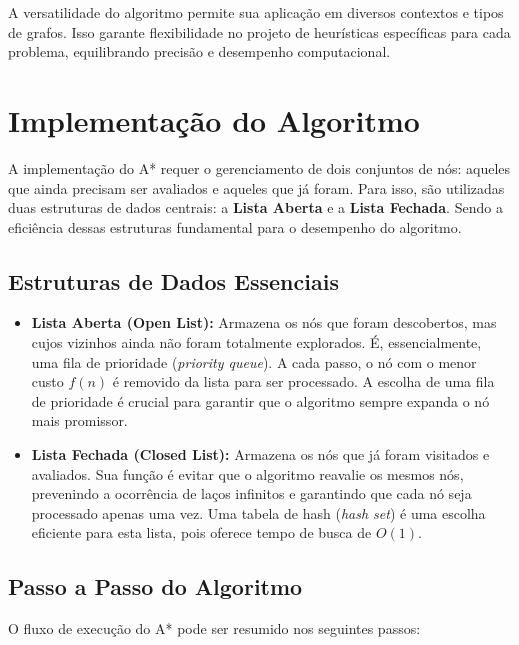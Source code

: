 \documentclass[conference]{IEEEtran}
\begin{document}
A versatilidade do algoritmo permite sua aplicação em diversos contextos e tipos de grafos. Isso garante flexibilidade no projeto de heurísticas específicas para cada problema, equilibrando precisão e desempenho computacional.

\section{Implementação do Algoritmo}
A implementação do A* requer o gerenciamento de dois conjuntos de nós: aqueles que ainda precisam ser avaliados e aqueles que já foram. Para isso, são utilizadas duas estruturas de dados centrais: a \textbf{Lista Aberta} e a \textbf{Lista Fechada}. Sendo a eficiência dessas estruturas fundamental para o desempenho do algoritmo.

\subsection{Estruturas de Dados Essenciais}
\begin{itemize}
    \item \textbf{Lista Aberta (Open List):} Armazena os nós que foram descobertos, mas cujos vizinhos ainda não foram totalmente explorados. É, essencialmente, uma fila de prioridade (\emph{priority queue}). A cada passo, o nó com o menor custo $f(n)$ é removido da lista para ser processado. A escolha de uma fila de prioridade é crucial para garantir que o algoritmo sempre expanda o nó mais promissor.
    \item \textbf{Lista Fechada (Closed List):} Armazena os nós que já foram visitados e avaliados. Sua função é evitar que o algoritmo reavalie os mesmos nós, prevenindo a ocorrência de laços infinitos e garantindo que cada nó seja processado apenas uma vez. Uma tabela de hash (\emph{hash set}) é uma escolha eficiente para esta lista, pois oferece tempo de busca de $O(1)$.
\end{itemize}

\subsection{Passo a Passo do Algoritmo}
O fluxo de execução do A* pode ser resumido nos seguintes passos:
\end{document}
